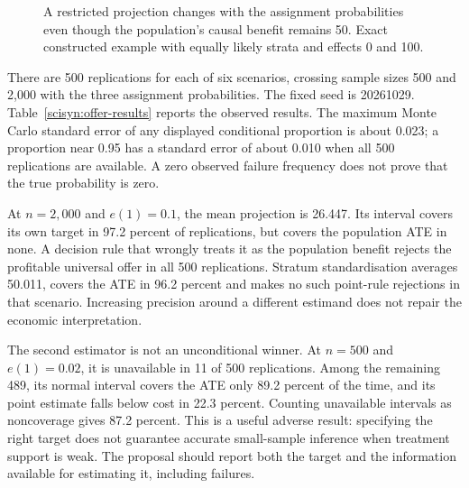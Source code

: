 \begin{figure}[htbp]
\centering
{}
\caption{A restricted projection changes with the assignment probabilities
even though the population's causal benefit remains 50. Exact constructed
example with equally likely strata and effects 0 and 100.}
\label{scisyn:projection-figure}
\end{figure}

There are 500 replications for each of six scenarios, crossing sample sizes
500 and 2,000 with the three assignment probabilities. The fixed seed is
20261029. Table~\ref{scisyn:offer-results} reports the observed results.
The maximum Monte Carlo standard error of any displayed conditional proportion
is about 0.023; a proportion near 0.95 has a standard error of about 0.010 when
all 500 replications are available. A zero observed failure frequency does not
prove that the true probability is zero.



At $n=2{,}000$ and $e(1)=0.1$, the mean projection is 26.447. Its interval covers
its own target in 97.2 percent of replications, but covers the population ATE in
none. A decision rule that wrongly treats it as the population benefit rejects
the profitable universal offer in all 500 replications. Stratum standardisation
averages 50.011, covers the ATE in 96.2 percent and makes no such point-rule
rejections in that scenario. Increasing precision around a different estimand
does not repair the economic interpretation.

The second estimator is not an unconditional winner. At $n=500$ and $e(1)=0.02$,
it is unavailable in 11 of 500 replications. Among the remaining 489, its normal
interval covers the ATE only 89.2 percent of the time, and its point estimate
falls below cost in 22.3 percent. Counting unavailable intervals as noncoverage
gives 87.2 percent. This is a useful adverse result: specifying the right target
does not guarantee accurate small-sample inference when treatment support is
weak. The proposal should report both the target and the information available
for estimating it, including failures.

